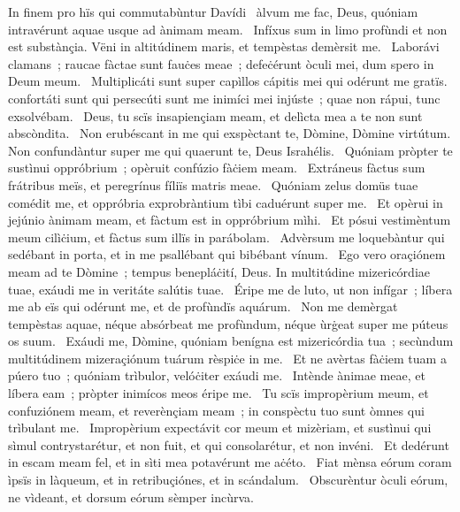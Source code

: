 { In finem pro hïs qui commutabùntur Davídi}
{%
~àlvum me fac, Deus, quóniam intravérunt aquae usque ad ànimam meam. 
~Infíxus sum in limo profùndi et non est substànçia. Vëni in altitúdinem maris, et tempèstas demèrsit me. 
~Laborávi clamans~; raucae fàctae sunt fauċes meae~; defeċérunt òculi mei, dum spero in Deum meum. 
~Multiplicáti sunt super capìllos cápitis mei qui odérunt me gratïs. confortáti sunt qui persecúti sunt me inimíci mei injúste~; quae non rápui, tunc exsolvébam. 
~Deus, tu scïs insapiençiam meam, et delìcta mea a te non sunt abscòndita. 
~Non erubéscant in me qui exspèctant te, Dòmine, Dòmine virtútum. Non confundàntur super me qui quaerunt te, Deus Israhélis. 
~Quóniam pròpter te sustìnui oppróbrium~; opèruit confúzio fàċiem meam. 
~Extráneus fàctus sum frátribus meïs, et peregrínus fíliïs matris meae. 
~Quóniam zelus domüs tuae comédit me, et oppróbria exprobràntium tìbi caduérunt super me. 
~Et opèrui in jejúnio ànimam meam, et fàctum est in oppróbrium mìhi. 
~Et pósui vestimèntum meum cilìċium, et fàctus sum illïs in parábolam. 
~Advèrsum me loquebàntur qui sedébant in porta, et in me psallébant qui bibébant vínum. 
~Ego vero oraçiónem meam ad te Dòmine~; tempus benepláċití, Deus. In multitúdine mizericórdiae tuae, exáudi me in veritáte salútis tuae. 
~Éripe me de luto, ut non infígar~; líbera me ab eïs qui odérunt me, et de profùndïs aquárum. 
~Non me demèrgat tempèstas aquae, néque absórbeat me profùndum, néque ùrġeat super me púteus os suum. 
~Exáudi me, Dòmine, quóniam benígna est mizericórdia tua~; secùndum multitúdinem mizeraçiónum tuárum rèspiċe in me. 
~Et ne avèrtas fàċiem tuam a púero tuo~; quóniam trìbulor, velóċiter exáudi me. 
~Intènde ànimae meae, et líbera eam~; pròpter inimícos meos éripe me. 
~Tu scïs impropèrium meum, et confuziónem meam, et reverènçiam meam~; in conspèctu tuo sunt òmnes qui trìbulant me. 
~Impropèrium expectávit cor meum et mizèriam, et sustìnui qui sìmul contrystarétur, et non fuit, et qui consolarétur, et non invéni. 
~Et dedérunt in escam meam fel, et in sìti mea potavérunt me aċéto. 
~Fiat mènsa eórum coram ìpsïs in làqueum, et in retribuçiónes, et in scándalum. 
~Obscurèntur òculi eórum, ne vìdeant, et dorsum eórum sèmper incùrva. 
}
